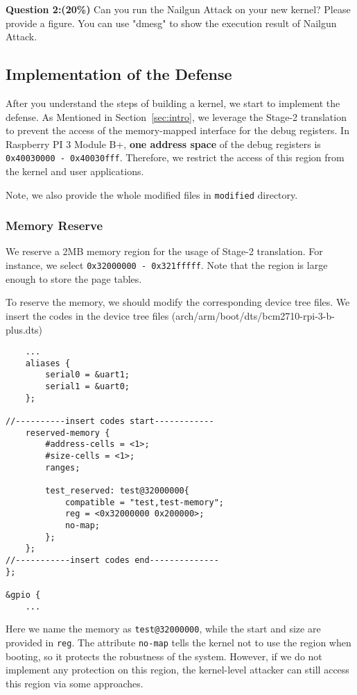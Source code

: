 \textbf{Question 2:(\textbf{20\%})} Can you run the Nailgun Attack on 
your new 
kernel? Please provide a figure. You can use "dmesg" to show the 
execution result of Nailgun Attack. 

\subsection{Implementation of the Defense}

After you understand the steps of building a kernel, we start to 
implement the defense. As Mentioned in Section~\ref{sec:intro}, we 
leverage the Stage-2 translation to prevent the access of the 
memory-mapped interface for the debug registers. In Raspberry PI 3 
Module B+, \textbf{one address space} of the debug registers is 
\texttt{0x40030000 - 0x40030fff}.
Therefore, we restrict the access of this region from the kernel and 
user applications.


Note, we also provide the whole modified files in \texttt{modified} 
directory.


\subsubsection{Memory Reserve}

We reserve a 2MB memory region for the usage of Stage-2 translation. 
For instance, we select \texttt{0x32000000 - 0x321fffff}. Note that 
the region is large enough to store the page tables.

To reserve the memory, we should modify the corresponding device tree 
files. We insert the codes in the device tree files 
(arch/arm/boot/dts/bcm2710-rpi-3-b-plus.dts)
\begin{lstlisting}
	...
	aliases {
		serial0 = &uart1;
		serial1 = &uart0;
	};

//----------insert codes start------------
	reserved-memory {
		#address-cells = <1>;
		#size-cells = <1>;
		ranges;
		
		test_reserved: test@32000000{
			compatible = "test,test-memory";
			reg = <0x32000000 0x200000>;
			no-map;
		};
	};
//-----------insert codes end--------------
};

&gpio {
	...
\end{lstlisting}



Here we name the memory as \texttt{test@32000000}, while the start and size are provided in \texttt{reg}. The attribute \texttt{no-map} tells the kernel not to use the region when booting, so it protects the robustness of the system. However, if we do not implement any protection on this region, the kernel-level attacker can still access this region via some approaches.

